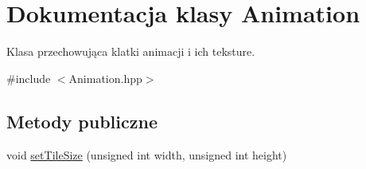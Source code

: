 \hypertarget{class_animation}{\section{Dokumentacja klasy Animation}
\label{class_animation}
}


Klasa przechowująca klatki animacji i ich teksture.  




{\ttfamily \#include $<$Animation.\-hpp$>$}

\subsection*{Metody publiczne}
\begin{DoxyCompactItemize}
\item 
\hypertarget{class_animation_ada4bef5d91687cdd610a830bd90093f9}{void \hyperlink{class_animation_ada4bef5d91687cdd610a830bd90093f9}{set\-Tile\-Size} (unsigned int width, unsigned int height)}\label{class_animation_ada4bef5d91687cdd610a830bd90093f9}


\end{DoxyCompactItemize}
